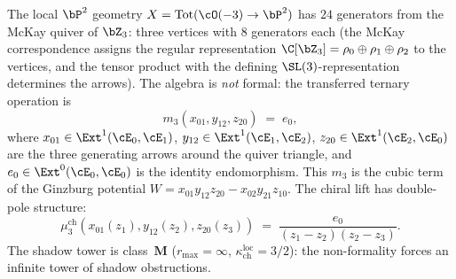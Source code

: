 \begin{computation}
\label{comp:local-p2-nonformality}
The local $\bP^2$ geometry
$X = \mathrm{Tot}(\cO(-3) \to \bP^2)$ has $24$ generators
from the McKay quiver of $\bZ_3$: three vertices with $8$
generators each (the McKay correspondence assigns the regular
representation $\C[\bZ_3] = \rho_0 \oplus \rho_1 \oplus \rho_2$
to the vertices, and the tensor product with the defining
$\SL(3)$-representation determines the arrows).
The algebra is \emph{not} formal: the transferred ternary
operation is
\[
 m_3(x_{01}, y_{12}, z_{20}) \;=\; e_0,
\]
where $x_{01} \in \Ext^1(\cE_0, \cE_1)$,
$y_{12} \in \Ext^1(\cE_1, \cE_2)$,
$z_{20} \in \Ext^1(\cE_2, \cE_0)$ are the three generating
arrows around the quiver triangle, and
$e_0 \in \Ext^0(\cE_0, \cE_0)$ is the identity endomorphism.
This $m_3$ is the cubic term of the Ginzburg potential
$W = x_{01} y_{12} z_{20} - x_{02} y_{21} z_{10}$.
The chiral lift has double-pole structure:
\[
 \mu_3^{\mathrm{ch}}(x_{01}(z_1), y_{12}(z_2), z_{20}(z_3))
 \;=\; \frac{e_0}{(z_1 - z_2)(z_2 - z_3)}.
\]
The shadow tower is class~$\mathbf{M}$ ($r_{\max} = \infty$,
$\kappa_{\mathrm{ch}}^{\mathrm{loc}} = 3/2$): the non-formality forces an infinite tower of
shadow obstructions.
\end{computation}


